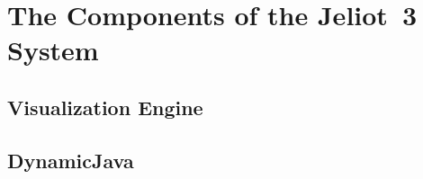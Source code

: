 \section{The Components of the Jeliot~3 System}
\label{sec:The_Components_of_the_Jeliot_3_System}




\subsection{Visualization Engine}
\label{sec:Visualization_Engine}




\subsection{DynamicJava}
\label{sec:DynamicJava}
